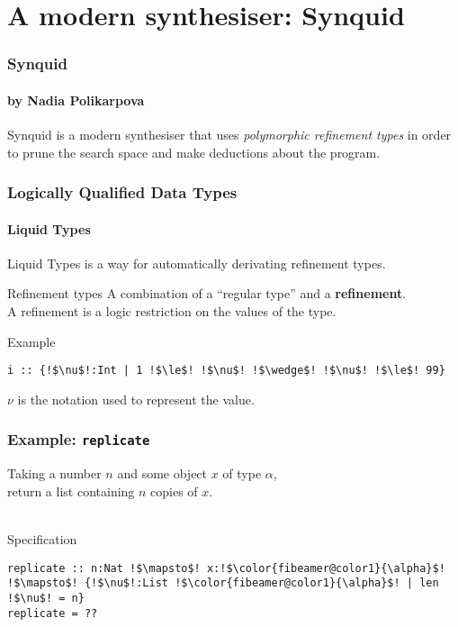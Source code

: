 \documentclass{beamer}
\makeatletter
\newcommand{\hl}{\textcolor{fibeamer@darkColor1}}
\theoremstyle{definition} %
\makeatother
\begin{document}
\section{A modern synthesiser: Synquid}

\begin{frame}
	\frametitle{\textbf{Synquid} \cite{polikarpova_program_2016}}
	\framesubtitle{by Nadia Polikarpova}

	Synquid is a modern synthesiser that uses \textit{polymorphic refinement types}
	in order to prune the search space and make deductions about the program.

\end{frame}

%

\begin{frame}[fragile]
	\frametitle{Logically Qualified Data Types}
	\framesubtitle{Liquid Types \cite{rondon_liquid_2008}}

	Liquid Types is a way for automatically derivating \hl{refinement types}.

	\begin{block}{Refinement types}
		A combination of a ``regular type'' and a \textbf{refinement}.\\
		A refinement is a logic restriction on the values of the type.\\
	\end{block}

	\pause

	\begin{exampleblock}{Example}
		\vspace*{-.2\baselineskip}
		\begin{lstlisting}[escapechar=!,style=synquid]
i :: {!$\nu$!:Int | 1 !$\le$! !$\nu$! !$\wedge$! !$\nu$! !$\le$! 99}
		\end{lstlisting}
	\end{exampleblock}
	$\nu$ is the notation used to represent the value.
\end{frame}

\begin{frame}[fragile]
	\frametitle{Example: \texttt{replicate}}

	Taking a number $n$ and some object $x$ of type $\alpha$,\\
	return a list containing $n$ copies of $x$.\\~\\

	\begin{exampleblock}{Specification}
		\vspace*{-.2\baselineskip}
		\begin{lstlisting}[escapechar=!,style=synquid]
replicate :: n:Nat !$\mapsto$! x:!$\color{fibeamer@color1}{\alpha}$! !$\mapsto$! {!$\nu$!:List !$\color{fibeamer@color1}{\alpha}$! | len !$\nu$! = n}
replicate = ??
		\end{lstlisting}
	\end{exampleblock}

\end{frame}
\end{document}
